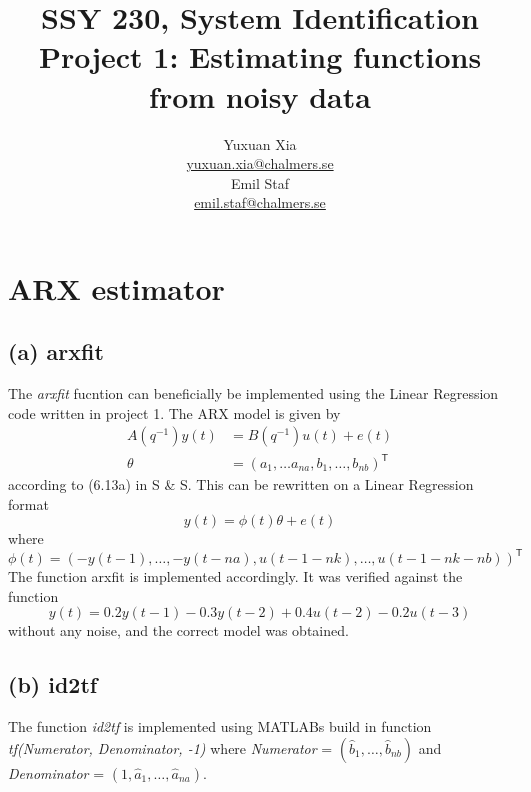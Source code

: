\documentclass[]{article}
\title{SSY 230, System Identification\\
	Project 1: Estimating functions from noisy data}
\author{Yuxuan Xia\\ \href{mailto:yuxuan.xia@chalmers.se}{yuxuan.xia@chalmers.se}\\Emil Staf\\\href{mailto:emil.staf@chalmers.se}{emil.staf@chalmers.se}}
\begin{document}
\maketitle

\section{ARX estimator}
\subsection{(a) arxfit}
The \emph{arxfit} fucntion can beneficially be implemented using the Linear Regression code written in project 1. The ARX model is given by
\begin{align}
	\label{eq:ARX}
	A(q^{-1})y(t) &= B(q^{-1})u(t) + e(t) \\
	\theta &= (a_1, \ldots a_{na}, b_1, \ldots, b_{nb})^\mathsf{T}
\end{align}
according to (6.13a) in S \& S. This can be rewritten on a Linear Regression format
\begin{equation}
	\label{eq:ARX_LR}
	y(t) = \phi(t) \theta + e(t)
\end{equation}
where
\begin{equation}
	\label{eq:ARX_LR_phi}
	\phi(t) = (-y(t-1), \ldots, -y(t-na), u(t-1-nk), \ldots, u(t-1-nk-nb))^\mathsf{T}
\end{equation}
The function arxfit is implemented accordingly. It was verified against the function 
\begin{equation}
	\label{eq:system}
	y(t) = 0.2y(t-1) - 0.3y(t-2) + 0.4u(t-2) - 0.2u(t-3)
\end{equation}
without any noise, and the correct model was obtained.

\subsection{(b) id2tf}
The function \emph{id2tf} is implemented using MATLABs build in function \emph{tf(Numerator, Denominator, -1)} where \emph{Numerator} = $(\hat{b}_1, \ldots, \hat{b}_{nb})$ and \emph{Denominator} = $(1, \hat{a}_1, \ldots, \hat{a}_{na})$.
\end{document}
